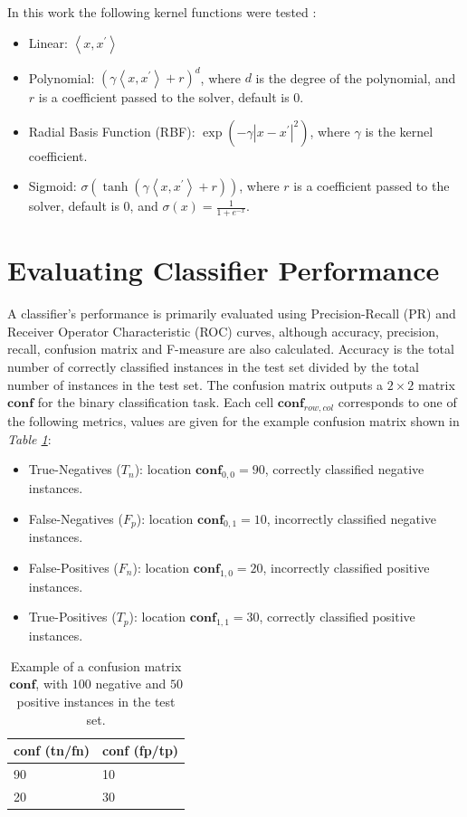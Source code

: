 \documentclass[ms]{nuthesis}
\begin{document}
In this work the following kernel functions were tested \cite{scikit-learn}:
\begin{itemize}
  \item Linear: $\left \langle x,x^{'} \right \rangle$
  \item Polynomial: $(\gamma \left \langle x,x^{'} \right \rangle + r)^{d}$, where $d$ is the degree
  of the polynomial, and $r$ is a coefficient passed to the solver, default is $0$.
  \item Radial Basis Function (RBF): $\exp(-\gamma |x-x^{'}|^{2})$, where $\gamma$ is the kernel coefficient.
  \item Sigmoid: $\sigma(\tanh(\gamma \left \langle x,x^{'} \right \rangle + r))$,
  where $r$ is a coefficient passed to the solver, default is $0$, and $\sigma(x)=\frac{1}{1+e^{-x}}$.
\end{itemize}


\section{Evaluating Classifier Performance}
\label{sect:PerformanceMetrics}
\par A classifier's performance is primarily evaluated using Precision-Recall (PR) and Receiver Operator
Characteristic (ROC) curves, although accuracy, precision, recall, confusion matrix and  F-measure
are also calculated. Accuracy is the total number of correctly classified instances in the test set
divided by the total number of instances in the test set. The confusion matrix
outputs a $2 \times 2$ matrix $\mathbf{conf}$
for the binary classification task. Each cell $\mathbf{conf}_{row,col}$
corresponds to one of the following metrics, values are given for the example confusion
matrix shown in \textit{Table \ref{tab:confEx}}:
\begin{itemize}
  \item True-Negatives ($T_n$): location $\mathbf{conf}_{0,0} = 90$, correctly classified negative instances.
  \item False-Negatives ($F_p$): location $\mathbf{conf}_{0,1} = 10$, incorrectly classified negative instances.
  \item False-Positives ($F_n$): location $\mathbf{conf}_{1,0} = 20$, incorrectly classified positive instances.
  \item True-Positives ($T_p$): location $\mathbf{conf}_{1,1} = 30$, correctly classified positive instances.
\end{itemize}

\FloatBarrier
\begin{table}[H]
\centering
\caption{Example of a confusion matrix $\mathbf{conf}$, with $100$ negative and $50$ positive instances in the test set.}
\label{tab:confEx}
\begin{tabular}{|l||l|}\toprule
conf (tn/fn) & conf (fp/tp) \\ \midrule
90 & 10 \\ \midrule
20 & 30 \\ \bottomrule
\end{tabular}
\end{table}
\FloatBarrier
\end{document}
